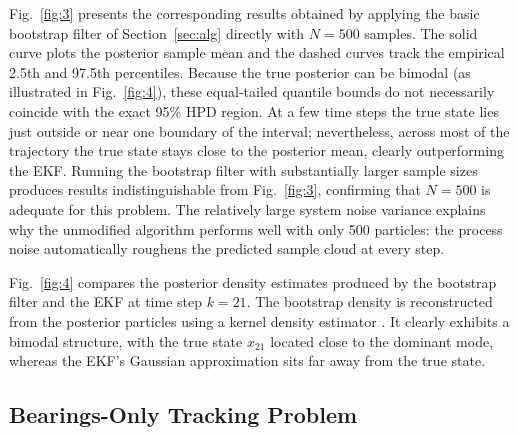 
Fig.~\ref{fig:3} presents the corresponding results obtained by applying the basic bootstrap filter of Section~\ref{sec:alg} directly with $N = 500$ samples. The solid curve plots the posterior sample mean and the dashed curves track the empirical 2.5th and 97.5th percentiles. Because the true posterior can be bimodal (as illustrated in Fig.~\ref{fig:4}), these equal-tailed quantile bounds do not necessarily coincide with the exact 95\% HPD region. At a few time steps the true state lies just outside or near one boundary of the interval; nevertheless, across most of the trajectory the true state stays close to the posterior mean, clearly outperforming the EKF. Running the bootstrap filter with substantially larger sample sizes produces results indistinguishable from Fig.~\ref{fig:3}, confirming that $N = 500$ is adequate for this problem. The relatively large system noise variance explains why the unmodified algorithm performs well with only 500 particles: the process noise automatically roughens the predicted sample cloud at every step.


Fig.~\ref{fig:4} compares the posterior density estimates produced by the bootstrap filter and the EKF at time step $k = 21$. The bootstrap density is reconstructed from the posterior particles using a kernel density estimator \cite{r13}. It clearly exhibits a bimodal structure, with the true state $x_{21}$ located close to the dominant mode, whereas the EKF's Gaussian approximation sits far away from the true state.


\subsection{Bearings-Only Tracking Problem}\label{sec:sim-bearings}

